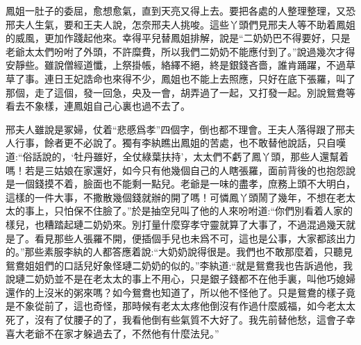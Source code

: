\begin{parag}
    鳳姐一肚子的委屈，愈想愈氣，直到天亮又得上去。要把各處的人整理整理，又恐邢夫人生氣，要和王夫人說，怎奈邢夫人挑唆。這些丫頭們見邢夫人等不助着鳳姐的威風，更加作踐起他來。幸得平兒替鳳姐排解，說是“二奶奶巴不得要好，只是老爺太太們吩咐了外頭，不許糜費，所以我們二奶奶不能應付到了。”說過幾次才得安靜些。雖說僧經道懺，上祭掛帳，絡繹不絕，終是銀錢吝嗇，誰肯踊躍，不過草草了事。連日王妃誥命也來得不少，鳳姐也不能上去照應，只好在底下張羅，叫了那個，走了這個，發一回急，央及一會，胡弄過了一起，又打發一起。別說鴛鴦等看去不象樣，連鳳姐自己心裏也過不去了。
\end{parag}


\begin{parag}
    邢夫人雖說是冢婦，仗着“悲慼爲孝”四個字，倒也都不理會。王夫人落得跟了邢夫人行事，餘者更不必說了。獨有李紈瞧出鳳姐的苦處，也不敢替他說話，只自嘆道:“俗話說的，‘牡丹雖好，全仗綠葉扶持’，太太們不虧了鳳丫頭，那些人還幫着嗎！若是三姑娘在家還好，如今只有他幾個自己的人瞎張羅，面前背後的也抱怨說是一個錢摸不着，臉面也不能剩一點兒。老爺是一味的盡孝，庶務上頭不大明白，這樣的一件大事，不撒散幾個錢就辦的開了嗎！可憐鳳丫頭鬧了幾年，不想在老太太的事上，只怕保不住臉了。”於是抽空兒叫了他的人來吩咐道:“你們別看着人家的樣兒，也糟踏起璉二奶奶來。別打量什麼穿孝守靈就算了大事了，不過混過幾天就是了。看見那些人張羅不開，便插個手兒也未爲不可，這也是公事，大家都該出力的。”那些素服李紈的人都答應着說:“大奶奶說得很是。我們也不敢那麼着，只聽見鴛鴦姐姐們的口話兒好象怪璉二奶奶的似的。”李紈道:“就是鴛鴦我也告訴過他，我說璉二奶奶並不是在老太太的事上不用心，只是銀子錢都不在他手裏，叫他巧媳婦還作的上沒米的粥來嗎？如今鴛鴦也知道了，所以他不怪他了。只是鴛鴦的樣子竟是不象從前了，這也奇怪，那時候有老太太疼他倒沒有作過什麼威福，如今老太太死了，沒有了仗腰子的了，我看他倒有些氣質不大好了。我先前替他愁，這會子幸喜大老爺不在家才躲過去了，不然他有什麼法兒。”
\end{parag}



